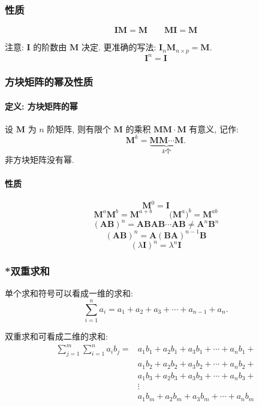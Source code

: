 \documentclass[UTF8]{ctexart}
\newcommand{\ve}[1]{\boldsymbol{\mathbf{#1}}}
\begin{document}
\subsubsection{性质}
\[ \ve I \ve M  = \ve M \qquad \ve M \ve I = \ve M \]

注意: $ \ve I $ 的阶数由 $ \ve M $ 决定. 更准确的写法: $ \ve I_n \ve M_{n \times p} = \ve M $.
\[ \ve I^n = \ve I \]


\subsubsection{方块矩阵的幂及性质}

\begin{framed}
    \vspace{-0.7em}
    \paragraph{定义: 方块矩阵的幂}
    设 $ \ve M $ 为 $ n $ 阶矩阵, 则有限个 $ \ve M $ 的乘积 $ \ve{MM} \cdot \ve M $ 有意义, 记作:
    \[ \ve M^k = \underset{k \text{个}}{\underbrace{\ve{MM} \cdots \ve M}} .\]
    非方块矩阵没有幂.
\end{framed}

\begin{framed}
    \vspace{-0.7em}
    \paragraph{性质}
    \[ \ve M^0 = \ve I \]
    \[ \ve M^a \ve M^b = \ve M^{a + b} \qquad \big(\ve M^a\big)^b = \ve M^{ab} \]
    \[ (\ve{AB})^n = \ve{ABAB} \cdots \ve{AB} \neq \ve A^n \ve B^n  \]
    \[ (\ve{AB})^n = \ve A (\ve{BA})^{n-1} \ve B \]
    \[ (\lambda \ve I)^n = \lambda^n \ve I \]
\end{framed}


\subsubsection{*双重求和}
单个求和符号可以看成一维的求和:
\[ \sum_{i = 1}^n a_i = a_1 + a_2 + a_3 + \cdots + a_{n - 1} + a_n  .\]

双重求和可看成二维的求和:
~
\begin{align*}
    \sum_{j = 1}^m \sum_{i = 1}^n a_i b_j =
    &a_1 b_1 + a_2 b_1 + a_3 b_1 + \cdots + a_n b_1 + \\
    &a_1 b_2 + a_2 b_2 + a_3 b_2 + \cdots + a_n b_2 + \\
    &a_1 b_3 + a_2 b_3 + a_3 b_3 + \cdots + a_n b_3 + \\
    \qquad & \vdots \\
    &a_1 b_m + a_2 b_m + a_3 b_m + \cdots + a_n b_m
\end{align*}
\end{document}
